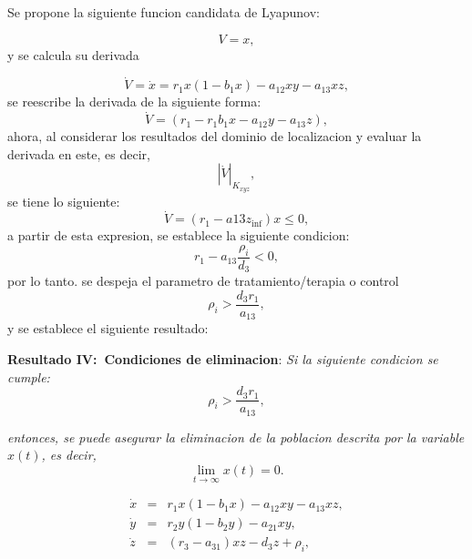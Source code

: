 \documentclass[letterpaper,11pt]{article}
\begin{document}
Se propone la siguiente funcion candidata de Lyapunov:

\begin{equation*}
V=x,
\end{equation*}%
y se calcula su derivada

\begin{equation*}
\dot{V}=\dot{x}=r_{1}x(1-b_{1}x)-a_{12}xy-a_{13}xz,
\end{equation*}%
se reescribe la derivada de la siguiente forma:%
\begin{equation*}
\dot{V}=(r_{1}-r_{1}b_{1}x-a_{12}y-a_{13}z),
\end{equation*}%
ahora, al considerar los resultados del dominio de localizacion y evaluar la
derivada en este, es decir,%
\begin{equation*}
\left\vert \dot{V}\right\vert _{K_{xyz}},
\end{equation*}%
se tiene lo siguiente:%
\begin{equation*}
\dot{V}=\left( r_{1}-a13z_{\inf }\right) x\leq 0,
\end{equation*}%
a partir de esta expresion, se establece la siguiente condicion:%
\begin{equation*}
r_{1}-a_{13}\frac{\rho _{i}}{d_{3}}<0,
\end{equation*}%
por lo tanto. se despeja el parametro de tratamiento/terapia o control%
\begin{equation*}
\rho _{i}>\frac{d_{3}r_{1}}{a_{13}},
\end{equation*}%
y se establece el siguiente resultado:

\bigskip 

\textbf{Resultado IV:\ Condiciones de eliminacion}: \textit{Si la siguiente
condicion se cumple:}%
\begin{equation*}
\rho _{i}>\frac{d_{3}r_{1}}{a_{13}},
\end{equation*}

\textit{entonces, se puede asegurar la eliminacion de la poblacion descrita
por la variable }$x\left( t\right) $\textit{, es decir,}%
\begin{equation*}
\lim_{t\rightarrow \infty }x\left( t\right) =0.
\end{equation*}

\textit{\bigskip }

\bigskip 

\bigskip 

\bigskip 

\bigskip 

\bigskip 

\bigskip 

\bigskip 

\bigskip 

\bigskip 

\bigskip 

\bigskip 

\bigskip 

\bigskip 

\bigskip 

\begin{eqnarray*}
\dot{x} &=&r_{1}x(1-b_{1}x)-a_{12}xy-a_{13}xz, \\
\dot{y} &=&r_{2}y(1-b_{2}y)-a_{21}xy, \\
\dot{z} &=&(r_{3}-a_{31})xz-d_{3}z+\rho _{i},
\end{eqnarray*}
\end{document}
